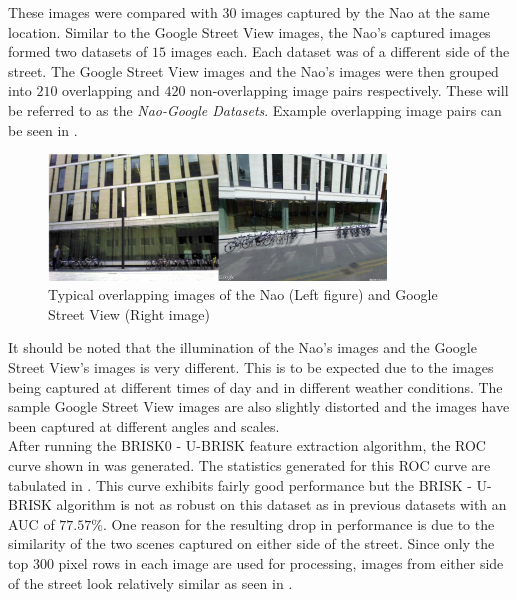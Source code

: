 These images were compared with $30$ images captured by the Nao at the same location. Similar to the Google Street View images, the Nao's captured images formed two datasets of $15$ images each. Each dataset was of a different side of the street. The Google Street View images and the Nao's images were then grouped into $210$ overlapping and $420$ non-overlapping image pairs respectively. These will be referred to as the \textit{Nao-Google Datasets}. Example overlapping image pairs can be seen in .\\

 \begin{figure}[h!] 
  \centering
    \includegraphics[width=0.8\textwidth]{../Drawings/streetView/googleOverlapping.jpg}
    \caption{Typical overlapping images of the Nao (Left figure) and Google Street View (Right image)}
    \label{fig:googleStreetOverlapping}
\end{figure}

It should be noted that the illumination of the Nao's images and the Google Street View's images is very different. This is to be expected due to the images being captured at different times of day and in different weather conditions. The sample Google Street View images are also slightly distorted and the images have been captured at different angles and scales.\\

After running the BRISK0 - U-BRISK feature extraction algorithm, the ROC curve shown in  was generated. The statistics generated for this ROC curve are tabulated in . This curve exhibits fairly good performance but the BRISK - U-BRISK algorithm is not as robust on this dataset as in previous datasets with an AUC of $77.57\%$. One reason for the resulting drop in performance is due to the similarity of the two scenes captured on either side of the street. Since only the top $300$ pixel rows in each image are used for processing, images from either side of the street look relatively similar as seen in .\\

